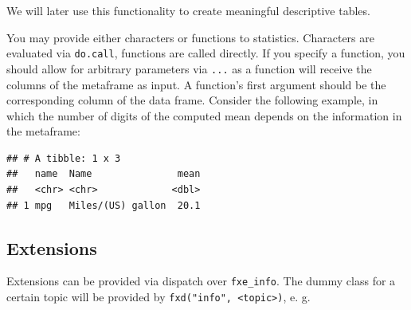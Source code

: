 \documentclass[]{report}
\newenvironment{Shaded}{\begin{snugshade}}{\end{snugshade}}
\newcommand{\KeywordTok}[1]{\textcolor[rgb]{0.13,0.29,0.53}{\textbf{#1}}}
\newcommand{\DataTypeTok}[1]{\textcolor[rgb]{0.13,0.29,0.53}{#1}}
\newcommand{\DecValTok}[1]{\textcolor[rgb]{0.00,0.00,0.81}{#1}}
\newcommand{\StringTok}[1]{\textcolor[rgb]{0.31,0.60,0.02}{#1}}
\newcommand{\ControlFlowTok}[1]{\textcolor[rgb]{0.13,0.29,0.53}{\textbf{#1}}}
\newcommand{\OperatorTok}[1]{\textcolor[rgb]{0.81,0.36,0.00}{\textbf{#1}}}
\newcommand{\NormalTok}[1]{#1}
\theoremstyle{definition}
\theoremstyle{definition}
\theoremstyle{definition}
\theoremstyle{remark}
\begin{document}
We will later use this functionality to create meaningful descriptive
tables.

You may provide either characters or functions to statistics. Characters
are evaluated via \texttt{do.call}, functions are called directly. If
you specify a function, you should allow for arbitrary parameters via
\texttt{...} as a function will receive the columns of the metaframe as
input. A function's first argument should be the corresponding column of
the data frame. Consider the following example, in which the number of
digits of the computed mean depends on the information in the metaframe:

\begin{Shaded}
\end{Shaded}

\begin{verbatim}
## # A tibble: 1 x 3
##   name  Name               mean
##   <chr> <chr>             <dbl>
## 1 mpg   Miles/(US) gallon  20.1
\end{verbatim}

\subsection{Extensions}\label{extensions-1}

Extensions can be provided via dispatch over \texttt{fxe\_info}. The
dummy class for a certain topic will be provided by
\texttt{fxd("info",\ \textless{}topic\textgreater{})}, e. g.
\end{document}

